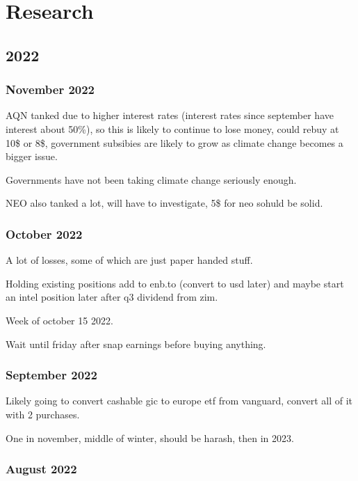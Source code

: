 \chapter{Research}


\section{2022}
\subsection{November 2022}

AQN tanked due to higher interest rates (interest rates since september have interest about 50\%), so this is likely to continue to lose money, could rebuy at 10\$ or 8\$, government subsibies are likely to grow as climate change becomes a bigger issue.

Governments have not been taking climate change seriously enough.

NEO also tanked a lot, will have to investigate, 5\$ for neo sohuld be solid.
\subsection{October 2022}

A lot of losses, some of which are just paper handed stuff.

Holding existing positions add to enb.to (convert to usd later) and maybe start an intel position later after q3 dividend from zim.

Week of october 15 2022.

Wait until friday after snap earnings before buying anything.



\subsection{September 2022}

Likely going to convert cashable gic to europe etf from vanguard, convert all of it with 2 purchases.

One in november, middle of winter, should be harash, then in 2023.

\subsection{August 2022}

